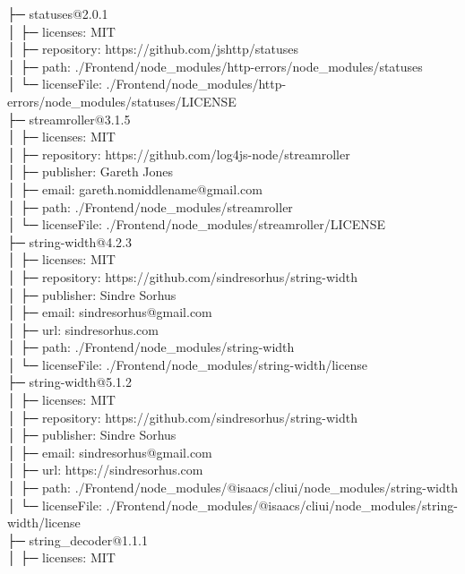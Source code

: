 \documentclass[
    paper=a4,
    twoside=false,
    parskip=half,
    listof=entryprefix,
    listof=totoc,
    index=totoc,
    bibliography=totoc,
    headsepline,
]{scrbook}
\begin{document}
    ├─ statuses@2.0.1\\
    │  ├─ licenses: MIT\\
    │  ├─ repository: https://github.com/jshttp/statuses\\
    │  ├─ path: ./Frontend/node\_modules/http-errors/node\_modules/statuses\\
    │  └─ licenseFile: ./Frontend/node\_modules/http-errors/node\_modules/statuses/LICENSE\\
    ├─ streamroller@3.1.5\\
    │  ├─ licenses: MIT\\
    │  ├─ repository: https://github.com/log4js-node/streamroller\\
    │  ├─ publisher: Gareth Jones\\
    │  ├─ email: gareth.nomiddlename@gmail.com\\
    │  ├─ path: ./Frontend/node\_modules/streamroller\\
    │  └─ licenseFile: ./Frontend/node\_modules/streamroller/LICENSE\\
    ├─ string-width@4.2.3\\
    │  ├─ licenses: MIT\\
    │  ├─ repository: https://github.com/sindresorhus/string-width\\
    │  ├─ publisher: Sindre Sorhus\\
    │  ├─ email: sindresorhus@gmail.com\\
    │  ├─ url: sindresorhus.com\\
    │  ├─ path: ./Frontend/node\_modules/string-width\\
    │  └─ licenseFile: ./Frontend/node\_modules/string-width/license\\
    ├─ string-width@5.1.2\\
    │  ├─ licenses: MIT\\
    │  ├─ repository: https://github.com/sindresorhus/string-width\\
    │  ├─ publisher: Sindre Sorhus\\
    │  ├─ email: sindresorhus@gmail.com\\
    │  ├─ url: https://sindresorhus.com\\
    │  ├─ path: ./Frontend/node\_modules/@isaacs/cliui/node\_modules/string-width\\
    │  └─ licenseFile: ./Frontend/node\_modules/@isaacs/cliui/node\_modules/string-width/license\\
    ├─ string\_decoder@1.1.1\\
    │  ├─ licenses: MIT\\
\end{document}
